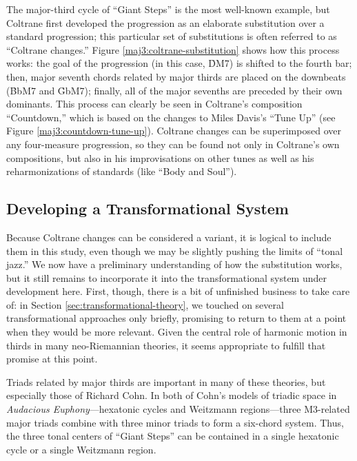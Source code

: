 The major-third cycle of ``Giant Steps'' is the most well-known example, but
Coltrane first developed the progression as an elaborate substitution over a
standard \tfo progression; this particular set of substitutions is often
referred to as ``Coltrane changes.'' Figure
\ref{maj3:coltrane-substitution} shows how this process works: the goal of the
progression (in this case, \h{DM7}) is shifted to the fourth bar; then, major
seventh chords related by major thirds are placed on the downbeats (\h{BbM7}
and \h{GbM7}); finally, all of the major sevenths are preceded by their own
dominants.\nocite{levine:1995} This process can clearly be seen in Coltrane's
composition ``Countdown,'' which is based on the changes to Miles Davis's
``Tune Up'' (see Figure \ref{maj3:countdown-tune-up}).
Coltrane changes can be superimposed over any four-measure \tfo progression,
so they can be found not only in Coltrane's own compositions, but also in his
improvisations on other tunes as well as his reharmonizations of standards
(like ``Body and Soul'').

\subsection{Developing a Transformational System}
\label{subsec:maj3-transformations}

Because Coltrane changes can be considered a \tf variant, it is logical to
include them in this study, even though we may be slightly pushing the limits
of ``tonal jazz.'' We now have a preliminary understanding of how the substitution
works, but it still remains to incorporate it into the transformational system
under development here. First, though, there is a bit of unfinished business
to take care of: in Section \ref{sec:transformational-theory}, we touched on
several transformational approaches only briefly, promising to return to them
at a point when they would be more relevant. Given the central role of
harmonic motion in thirds in many neo-Riemannian theories, it seems
appropriate to fulfill that promise at this point.

Triads related by major thirds are important in many of these theories,
but especially those of Richard Cohn. In both of Cohn's models of triadic
space in \emph{Audacious Euphony}---hexatonic cycles and Weitzmann
regions---three M3-related major triads combine with three minor triads to
form a six-chord system. Thus, the three tonal centers of ``Giant
Steps'' can be contained in a single hexatonic cycle or a single Weitzmann
region.


